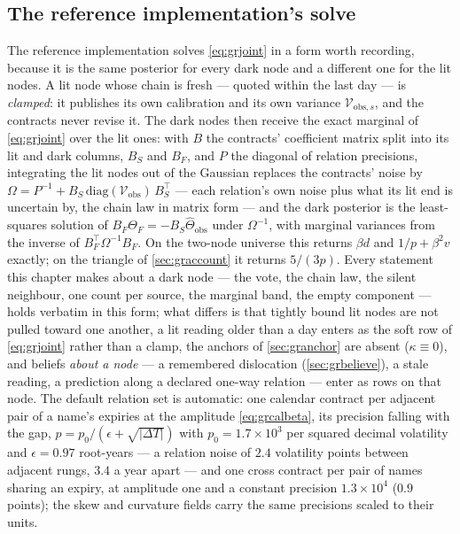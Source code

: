 \subsection{The reference implementation's solve}
\label{sec:grlayered}

The reference implementation solves \cref{eq:grjoint} in a form
worth recording, because it is the same posterior for every dark
node and a different one for the lit nodes.  A lit node whose chain
is fresh --- quoted within the last day --- is \emph{clamped}: it
publishes its own calibration and its own variance
$\mathcal{V}_{\mathrm{obs},s}$, and the contracts never revise it.
The dark nodes then receive the exact marginal of \cref{eq:grjoint}
over the lit ones: with $B$ the contracts' coefficient matrix split
into its lit and dark columns, $B_S$ and $B_F$, and $P$ the diagonal
of relation precisions, integrating the lit nodes out of the
Gaussian replaces the contracts' noise by
$\Omega=P^{-1}+B_S\,\mathrm{diag}(\mathcal{V}_{\mathrm{obs}})\,B_S^{\top}$
--- each relation's own noise plus what its lit end is uncertain by,
the chain law in matrix form --- and the dark posterior is the
least-squares solution of $B_F\Theta_F=-B_S\hat\Theta_{\mathrm{obs}}$
under $\Omega^{-1}$, with marginal variances from the inverse of
$B_F^{\top}\Omega^{-1}B_F$.  On the two-node universe this returns
$\beta d$ and $1/p+\beta^{2}v$ exactly; on the triangle of
\cref{sec:graccount} it returns $5/(3p)$.  Every statement this
chapter makes about a dark node --- the vote, the chain law, the
silent neighbour, one count per source, the marginal band, the empty
component --- holds verbatim in this form; what differs is that
tightly bound lit nodes are not pulled toward one another, a lit
reading older than a day enters as the soft row of \cref{eq:grjoint}
rather than a clamp, the anchors of \cref{sec:granchor} are absent
($\kappa\equiv0$), and beliefs \emph{about a node} --- a remembered
dislocation (\cref{sec:grbelieve}), a stale reading, a prediction
along a declared one-way relation --- enter as rows on that node.
The default relation set is automatic: one calendar contract per
adjacent pair of a name's expiries at the amplitude
\cref{eq:grcalbeta}, its precision falling with the gap,
$p=p_0/(\epsilon+\sqrt{|\Delta T|})$ with $p_0=1.7\times10^{3}$ per
squared decimal volatility and $\epsilon=0.97$ root-years --- a
relation noise of $2.4$ volatility points between adjacent rungs,
$3.4$ a year apart --- and one cross contract per pair of names
sharing an expiry, at amplitude one and a constant precision
$1.3\times10^{4}$ ($0.9$ points); the skew and curvature fields
carry the same precisions scaled to their units.

